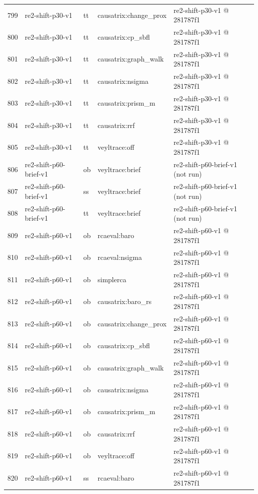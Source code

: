 \begin{longtable}{@{}r>{\raggedright\arraybackslash}p{87.0pt}>{\raggedright\arraybackslash}p{18.0pt}>{\raggedright\arraybackslash}p{63.0pt}>{\raggedright\arraybackslash}p{108.0pt}@{}}
799 & re2-shift-p30-v1 & tt & causatrix:change\_prox & re2-shift-p30-v1 @ 281787f1 \\
800 & re2-shift-p30-v1 & tt & causatrix:cp\_sbfl & re2-shift-p30-v1 @ 281787f1 \\
801 & re2-shift-p30-v1 & tt & causatrix:graph\_walk & re2-shift-p30-v1 @ 281787f1 \\
802 & re2-shift-p30-v1 & tt & causatrix:nsigma & re2-shift-p30-v1 @ 281787f1 \\
803 & re2-shift-p30-v1 & tt & causatrix:prism\_m & re2-shift-p30-v1 @ 281787f1 \\
804 & re2-shift-p30-v1 & tt & causatrix:rrf & re2-shift-p30-v1 @ 281787f1 \\
805 & re2-shift-p30-v1 & tt & veyltrace:off & re2-shift-p30-v1 @ 281787f1 \\
806 & re2-shift-p60-brief-v1 & ob & veyltrace:brief & re2-shift-p60-brief-v1 (not run) \\
807 & re2-shift-p60-brief-v1 & ss & veyltrace:brief & re2-shift-p60-brief-v1 (not run) \\
808 & re2-shift-p60-brief-v1 & tt & veyltrace:brief & re2-shift-p60-brief-v1 (not run) \\
809 & re2-shift-p60-v1 & ob & rcaeval:baro & re2-shift-p60-v1 @ 281787f1 \\
810 & re2-shift-p60-v1 & ob & rcaeval:nsigma & re2-shift-p60-v1 @ 281787f1 \\
811 & re2-shift-p60-v1 & ob & simplerca & re2-shift-p60-v1 @ 281787f1 \\
812 & re2-shift-p60-v1 & ob & causatrix:baro\_rs & re2-shift-p60-v1 @ 281787f1 \\
813 & re2-shift-p60-v1 & ob & causatrix:change\_prox & re2-shift-p60-v1 @ 281787f1 \\
814 & re2-shift-p60-v1 & ob & causatrix:cp\_sbfl & re2-shift-p60-v1 @ 281787f1 \\
815 & re2-shift-p60-v1 & ob & causatrix:graph\_walk & re2-shift-p60-v1 @ 281787f1 \\
816 & re2-shift-p60-v1 & ob & causatrix:nsigma & re2-shift-p60-v1 @ 281787f1 \\
817 & re2-shift-p60-v1 & ob & causatrix:prism\_m & re2-shift-p60-v1 @ 281787f1 \\
818 & re2-shift-p60-v1 & ob & causatrix:rrf & re2-shift-p60-v1 @ 281787f1 \\
819 & re2-shift-p60-v1 & ob & veyltrace:off & re2-shift-p60-v1 @ 281787f1 \\
820 & re2-shift-p60-v1 & ss & rcaeval:baro & re2-shift-p60-v1 @ 281787f1 \\

\end{longtable}
